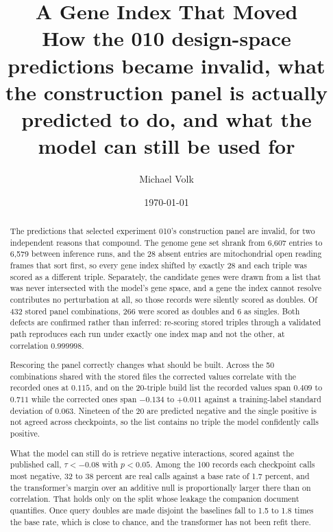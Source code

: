 \documentclass[10pt,a4paper]{article}
\title{\vspace{-1.5em}A Gene Index That Moved\\
  {\large How the 010 design-space predictions became invalid, what the
   construction panel is actually predicted to do, and what the model can still
   be used for}}
\author{Michael Volk}
\date{\today}
\begin{document}
\maketitle
\thispagestyle{empty}

\begin{abstract}
\noindent
The predictions that selected experiment 010's construction panel are invalid,
for two independent reasons that compound. The genome gene set shrank from
6{,}607 entries to 6{,}579 between inference runs, and the 28 absent entries are
mitochondrial open reading frames that sort first, so every gene index shifted by
exactly 28 and each triple was scored as a different triple. Separately, the
candidate genes were drawn from a list that was never intersected with the
model's gene space, and a gene the index cannot resolve contributes no
perturbation at all, so those records were silently scored as doubles. Of 432
stored panel combinations, 266 were scored as doubles and 6 as singles. Both
defects are confirmed rather than inferred: re-scoring stored triples through a
validated path reproduces each run under exactly one index map and not the other,
at correlation $0.999998$.

Rescoring the panel correctly changes what should be built. Across the 50
combinations shared with the stored files the corrected values correlate with the
recorded ones at $0.115$, and on the 20-triple build list the recorded values
span $0.409$ to $0.711$ while the corrected ones span $-0.134$ to $+0.011$
against a training-label standard deviation of $0.063$. Nineteen of the 20 are
predicted negative and the single positive is not agreed across checkpoints, so
the list contains no triple the model confidently calls positive.

What the model can still do is retrieve negative interactions, scored against the
published call, $\tau < -0.08$ with $p < 0.05$. Among the 100 records each
checkpoint calls most negative, 32 to 38 percent are real calls against a base
rate of 1.7 percent, and the transformer's margin over an additive null is
proportionally larger there than on correlation. That holds only on the split
whose leakage the companion document quantifies. Once query doubles are made
disjoint the baselines fall to 1.5 to 1.8 times the base rate, which is close to
chance, and the transformer has not been refit there.
\end{abstract}

\vspace{0.5em}
\tccontents
\clearpage






\end{document}
